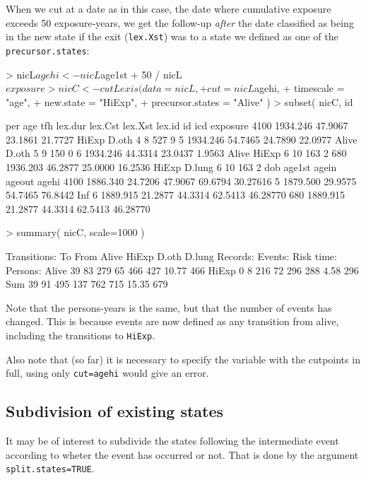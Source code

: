 \documentclass[a4paper,twoside,12pt]{article}
\begin{document}
When we cut at a date as in this case, the date where cumulative
exposure exceeds 50 exposure-years, we get the follow-up \emph{after}
the date classified as being in the new state if the exit
(\texttt{lex.Xst}) was to a state we defined as one of the
\texttt{precursor.states}:
\begin{Schunk}
\begin{Sinput}
> nicL$agehi <- nicL$age1st + 50 / nicL$exposure
> nicC <- cutLexis( data = nicL,
+                    cut = nicL$agehi,
+              timescale = "age",
+              new.state = "HiExp",
+       precursor.states = "Alive" )
> subset( nicC, id %in% 8:10 )
\end{Sinput}
\begin{Soutput}
          per     age     tfh lex.dur lex.Cst lex.Xst lex.id id icd exposure
4100 1934.246 47.9067 23.1861 21.7727   HiExp   D.oth      4  8 527        9
5    1934.246 54.7465 24.7890 22.0977   Alive   D.oth      5  9 150        0
6    1934.246 44.3314 23.0437  1.9563   Alive   HiExp      6 10 163        2
680  1936.203 46.2877 25.0000 16.2536   HiExp  D.lung      6 10 163        2
          dob  age1st   agein  ageout    agehi
4100 1886.340 24.7206 47.9067 69.6794 30.27616
5    1879.500 29.9575 54.7465 76.8442      Inf
6    1889.915 21.2877 44.3314 62.5413 46.28770
680  1889.915 21.2877 44.3314 62.5413 46.28770
\end{Soutput}
\begin{Sinput}
> summary( nicC, scale=1000 )
\end{Sinput}
\begin{Soutput}
Transitions:
     To
From    Alive HiExp D.oth D.lung  Records:  Events: Risk time:  Persons:
  Alive    39    83   279     65       466      427      10.77       466
  HiExp     0     8   216     72       296      288       4.58       296
  Sum      39    91   495    137       762      715      15.35       679
\end{Soutput}
\end{Schunk}
Note that the persons-years is the same, but that the number of events
has changed. This is because events are now defined as any transition
from alive, including the transitions to \texttt{HiExp}.

Also note that (so far) it is necessary to specify the variable with
the cutpoints in full, using only \texttt{cut=agehi} would give an error.

\subsection{Subdivision of existing states}
It may be of interest to subdivide the states following the
intermediate event according to wheter the event has occurred or
not. That is done by the argument \texttt{split.states=TRUE}.
\end{document}
